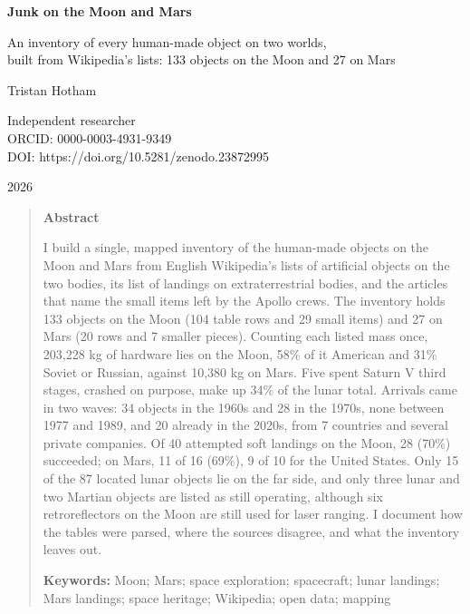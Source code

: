 \documentclass[11pt,a4paper]{article}
\begin{document}
\begin{center}
{\Large\bfseries Junk on the Moon and Mars\par}
\vspace{0.4em}
{\large An inventory of every human-made object on two worlds,\\built from Wikipedia's lists: 133 objects on the Moon and 27 on Mars\par}
\vspace{1.2em}
{\large Tristan Hotham\par}
\vspace{0.3em}
{\small Independent researcher\\
ORCID: 0000-0003-4931-9349\\
DOI: https://doi.org/10.5281/zenodo.23872995\par}
\vspace{0.8em}
2026
\end{center}

\begin{quote}
\small
\begin{center}\textbf{Abstract}\end{center}
I build a single, mapped inventory of the human-made objects on the Moon and Mars from English Wikipedia's lists of artificial objects on the two bodies, its list of landings on extraterrestrial bodies, and the articles that name the small items left by the Apollo crews. The inventory holds 133 objects on the Moon (104 table rows and 29 small items) and 27 on Mars (20 rows and 7 smaller pieces). Counting each listed mass once, 203,228 kg of hardware lies on the Moon, 58\% of it American and 31\% Soviet or Russian, against 10,380 kg on Mars. Five spent Saturn V third stages, crashed on purpose, make up 34\% of the lunar total. Arrivals came in two waves: 34 objects in the 1960s and 28 in the 1970s, none between 1977 and 1989, and 20 already in the 2020s, from 7 countries and several private companies. Of 40 attempted soft landings on the Moon, 28 (70\%) succeeded; on Mars, 11 of 16 (69\%), 9 of 10 for the United States. Only 15 of the 87 located lunar objects lie on the far side, and only three lunar and two Martian objects are listed as still operating, although six retroreflectors on the Moon are still used for laser ranging. I document how the tables were parsed, where the sources disagree, and what the inventory leaves out.

\textbf{Keywords:} Moon; Mars; space exploration; spacecraft; lunar landings; Mars landings; space heritage; Wikipedia; open data; mapping
\end{quote}
\end{document}
